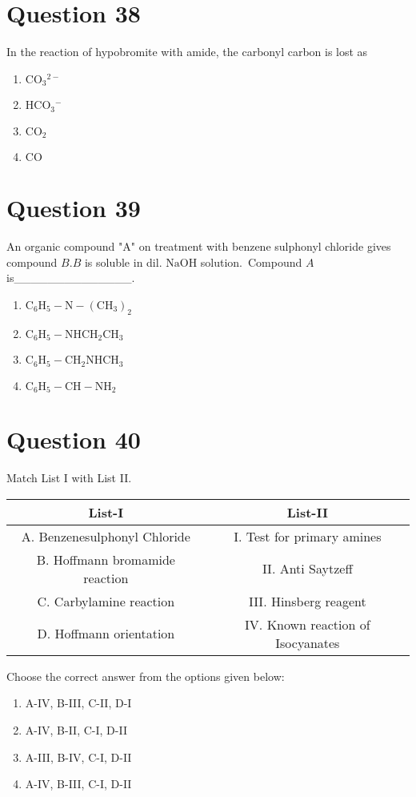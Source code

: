 \documentclass{article}
\begin{document}
\section*{Question 38}
In the reaction of hypobromite with amide, the carbonyl carbon is lost as 
\begin{enumerate}[label=(\alph*)]
\item \(\mathrm{CO}_3{ }^{2-}\)
\item \(\mathrm{HCO}_3{ }^{-}\)
\item \(\mathrm{CO}_2\)
\item \(\mathrm{CO}\)
\end{enumerate}
\newpage
\section*{Question 39}
An organic compound "A" on treatment with benzene sulphonyl chloride gives compound \(B . B\) is soluble in dil. \(\mathrm{NaOH}\) solution. Compound \(A\) is______________. 
\begin{enumerate}[label=(\alph*)]
\item \(\mathrm{C}_6 \mathrm{H}_5-\mathrm{N}-\left(\mathrm{CH}_3\right)_2\)
\item \(\mathrm{C}_6 \mathrm{H}_5-\mathrm{NHCH}_2 \mathrm{CH}_3\)
\item \(\mathrm{C}_6 \mathrm{H}_5-\mathrm{CH}_2 \mathrm{NHCH}_3\)
\item \(\mathrm{C}_6 \mathrm{H}_5-\mathrm{CH}-\mathrm{NH}_2\)
\end{enumerate}
\newpage
\section*{Question 40}
Match List I with List II.
    \setlength{\arrayrulewidth}{0.8mm}
    \begin{tabular}{|c|c|}
    \hline
    List-I & List-II \\
\hline
A. Benzenesulphonyl Chloride & I. Test for primary amines \\
\hline
B. Hoffmann bromamide reaction & II. Anti Saytzeff \\
\hline
C. Carbylamine reaction & III. Hinsberg reagent \\
\hline
D. Hoffmann orientation & IV. Known reaction of Isocyanates \\
\hline

    \end{tabular}
    \setlength{\arrayrulewidth}{0.4mm}
    Choose the correct answer from the options given below: \newline
\begin{enumerate}[label=(\alph*)]
\item A-IV, B-III, C-II, D-I
\item A-IV, B-II, C-I, D-II
\item A-III, B-IV, C-I, D-II
\item A-IV, B-III, C-I, D-II
\end{enumerate}
\newpage
\end{document}
